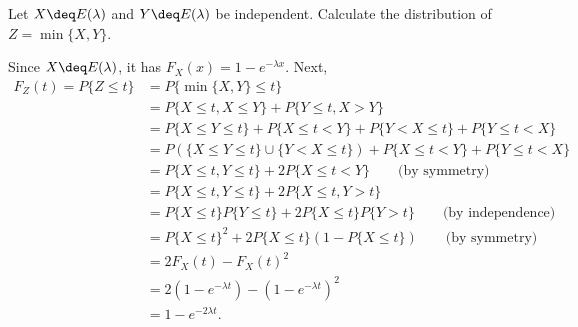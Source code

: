 \begin{exercise}
  Let $X\deq E(\lambda)$ and $Y\deq E(\lambda)$ be independent. Calculate the distribution of $Z=\min\{X,Y\}$.
\end{exercise}
\begin{solution}
  Since $X\deq E(\lambda)$, it has $F_X(x)=1-e^{-\lambda x}$. Next,
  \begin{align*}
    F_Z(t) = P\{Z\leq t\} &= P\{\min\{X,Y\}\leq t\} \\
      &= P\{X\leq t, X\leq Y\} + P\{Y\leq t, X>Y\} \\
      &= P\{X\leq Y\leq t \} + P\{X\leq t<Y\} + P\{Y< X\leq t\} + P\{Y\leq t< X\} \\
      &= P(\{X\leq Y\leq t\}\cup\{Y<X\leq t\}) + P\{X\leq t<Y\} + P\{Y\leq t< X\} \\
      &= P\{X\leq t, Y\leq t\} + 2P\{X\leq t<Y\} \qquad\mbox{(by symmetry)} \\
      &= P\{X\leq t, Y\leq t\} + 2P\{X\leq t, Y>t\} \\
      &= P\{X\leq t\}P\{Y\leq t\} + 2P\{X\leq t\}P\{Y>t\} \qquad\mbox{(by independence)} \\
      &= P\{X\leq t\}^2 + 2P\{X\leq t\}(1-P\{X\leq t\}) \qquad\mbox{(by symmetry)} \\
      &= 2F_X(t) - F_X(t)^2 \\
      &= 2(1-e^{-\lambda t}) - (1-e^{-\lambda t})^2 \\
      &= 1 - e^{-2\lambda t} .
  \end{align*}
\end{solution}

